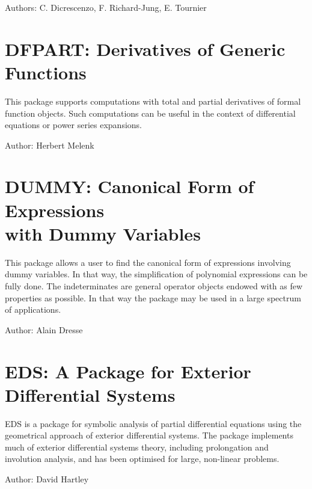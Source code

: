 Authors: C. Dicrescenzo, F. Richard-Jung, E. Tournier



\newpage

\section{DFPART: Derivatives of Generic Functions}

This package supports computations with total and partial derivatives of
formal function objects.  Such computations can be useful in the context
of differential equations or power series expansions.

Author: Herbert Melenk



\newpage

\section[DUMMY: Canonical Form of Expressions with Dummy Variables]{DUMMY: Canonical Form of Expressions\\with Dummy Variables}

This package allows a user to find the canonical form of expressions
involving dummy variables. In that way, the simplification of
polynomial expressions can be fully done. The indeterminates are general
operator objects endowed with as few properties as possible. In that way
the package may be used in a large spectrum of applications.

Author: Alain Dresse



\newpage

\section{EDS: A Package for Exterior Differential Systems}

EDS is a \REDUCE package for symbolic analysis of partial differential
equations using the geometrical approach of exterior differential
systems. The package implements much of exterior differential systems
theory, including prolongation and involution analysis, and has been
optimised for large, non-linear problems.

Author: David Hartley



\newpage


